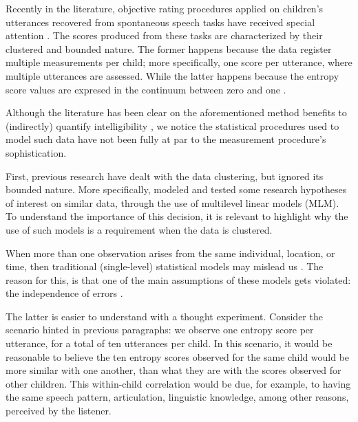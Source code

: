 Recently in the literature, objective rating procedures applied on children's utterances recovered from spontaneous speech tasks have received special attention \citep{Boonen_et_al_2021, Hustad_et_al_2020}. The scores produced from these tasks are characterized by their clustered and bounded nature. The former happens because the data register multiple measurements per child; more specifically, one score per utterance, where multiple utterances are assessed. While the latter happens because the entropy score values are expresed in the continuum between zero and one \citep{Shannon_1948}.

\begin{comment}	
	
	Moreover, the previous advantages are further emphasized by the use of stimuli gathered from spontaneous speech tasks, as they have a greater level of ecological validity, especially compared to contextualized utterances or reading at loud tasks \citep{Flipsen_2006, Ertmer_2011}.
	
\end{comment}

Although the literature has been clear on the aforementioned method benefits to (indirectly) quantify intelligibility \citep{Boonen_et_al_2020, Boonen_et_al_2021, Hustad_et_al_2020}, we notice the statistical procedures used to model such data have not been fully at par to the measurement procedure's sophistication.

First, previous research have dealt with the data clustering, but ignored its bounded nature. More specifically, \cite{Boonen_et_al_2021} modeled and tested some research hypotheses of interest on similar data, through the use of multilevel linear models (MLM). To understand the importance of this decision, it is relevant to highlight why the use of such models is a requirement when the data is clustered. 

When more than one observation arises from the same individual, location, or time, then traditional (single-level) statistical models may mislead us \citep{McElreath_2020}. The reason for this, is that one of the main assumptions of these models gets violated: the independence of errors \citep{Finch_et_al_2019}.

The latter is easier to understand with a thought experiment. Consider the scenario hinted in previous paragraphs: we observe one entropy score per utterance, for a total of ten utterances per child. In this scenario, it would be reasonable to believe the ten entropy scores observed for the same child would be more similar with one another, than what they are with the scores observed for other children. This within-child correlation would be due, for example, to having the same speech pattern,  articulation, linguistic knowledge, among other reasons, perceived by the listener.


